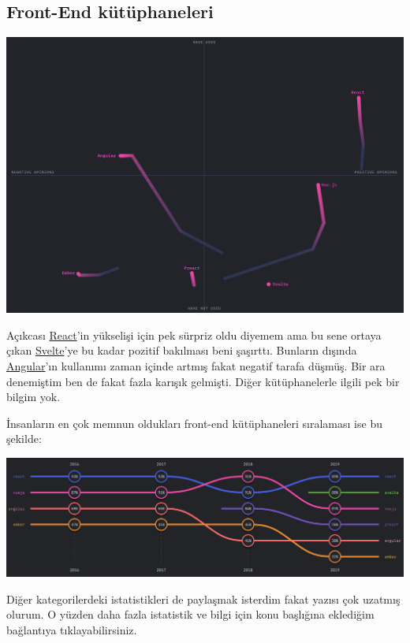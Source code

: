 \documentclass[11pt]{article}
\begin{document}
\subsection{Front-End kütüphaneleri}
\label{sec:orge2aa9e5}
\begin{center}
\includegraphics[width=.9\linewidth]{gorseller/sojs-front-end.png}
\end{center}

Açıkcası \href{https://reactjs.org/}{React}'in yükselişi için pek sürpriz oldu diyemem ama bu sene ortaya
çıkan \href{https://svelte.dev/}{Svelte}'ye bu kadar pozitif bakılması beni şaşırttı. Bunların dışında
\href{https://angular.io/}{Angular}'ın kullanımı zaman içinde artmış fakat negatif tarafa düşmüş. Bir ara
denemiştim ben de fakat fazla karışık gelmişti. Diğer kütüphanelerle ilgili
pek bir bilgim yok.

İnsanların en çok memnun oldukları front-end kütüphaneleri sıralaması ise bu
şekilde:

\begin{center}
\includegraphics[width=.9\linewidth]{gorseller/sojs-front-end-memnuniyet.png}
\end{center}

Diğer kategorilerdeki istatistikleri de paylaşmak isterdim fakat yazısı çok
uzatmış olurum. O yüzden daha fazla istatistik ve bilgi için konu başlığına
eklediğim bağlantıya tıklayabilirsiniz.
\end{document}

